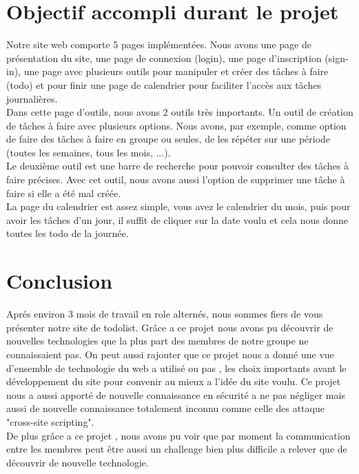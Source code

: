 \documentclass[a4paper,12pt]{report}
\begin{document}
\chapter{Objectif accompli durant le projet}

Notre site web comporte 5 pages implémentées. Nous avons une page de présentation du site, une page de connexion (login), une page d'inscription (sign-in), une page avec plusieurs outils pour manipuler et créer des tâches à faire (todo) et pour finir une page de calendrier pour faciliter l'accès aux tâches journalières.\\

Dans cette page d'outils, nous avons 2 outils très importants. Un outil de création de tâches à faire avec plusieurs options. Nous avons, par exemple, comme option de faire des tâches à faire en groupe ou seules, de les répéter sur une période (toutes les semaines, tous les mois, ...).\\
Le deuxième outil est une barre de recherche pour pouvoir consulter des tâches à faire précises. Avec cet outil, nous avons aussi l'option de supprimer une tâche à faire si elle a été mal créée.\\

La page du calendrier est assez simple, vous avez le calendrier du mois, puis pour avoir les tâches d'un jour, il suffit de cliquer sur la date voulu et cela nous donne toutes les todo de la journée.

\chapter{Conclusion}

Aprés environ 3 mois de travail en role alternés, nous sommes fiers de vous présenter notre site de todolist.
Grâce a ce projet nous avons pu découvrir de nouvelles technologies que la plus part des membres de notre groupe ne connaissaient pas. On peut aussi rajouter que ce projet nous a donné une vue d'ensemble de technologie du web a utilisé ou pas , les choix importants avant le développement du site pour convenir au mieux a l'idée du site voulu. Ce projet nous a aussi apporté de nouvelle connaissance en sécurité a ne pas négliger mais aussi de nouvelle connaissance totalement inconnu comme celle des attaque "cross-site scripting".\\ 
De plus grâce a ce projet , nous avons pu voir que par moment la communication entre les membres peut être aussi un challenge bien plus difficile a relever que de découvrir de nouvelle technologie.
 
\end{document}
